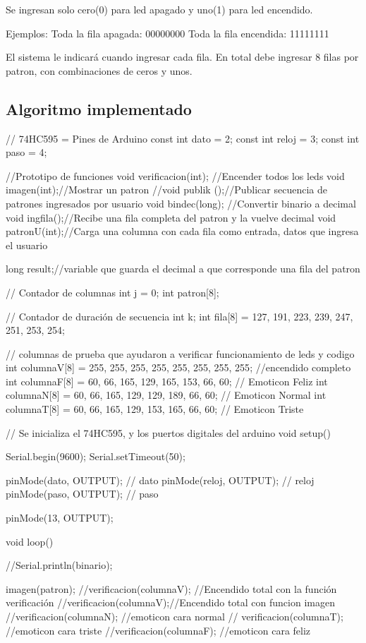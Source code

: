 \documentclass{article}
\begin{document}
Se ingresan solo cero(0) para led apagado y uno(1) para led encendido.

\vspace{0.5cm}
Ejemplos:
  \vspace{0.5cm}
Toda la fila apagada: 00000000
Toda la fila encendida: 11111111

El sistema le indicará cuando ingresar cada fila.
En total debe ingresar 8 filas por patron, con combinaciones de ceros y unos.


\subsection{Algoritmo implementado}
// 74HC595 = Pines de Arduino
const int dato = 2;
const int reloj = 3;
const int paso = 4;


//Prototipo de funciones
void verificacion(int); //Encender todos los leds
void imagen(int);//Mostrar un patron
//void publik ();//Publicar secuencia de patrones ingresados por usuario
void bindec(long); //Convertir binario a decimal
void ingfila();//Recibe una fila completa del patron y la vuelve decimal
void patronU(int);//Carga una columna con cada fila como entrada, datos que ingresa el usuario


long result;//variable que guarda el decimal a que corresponde una fila del patron

// Contador de columnas
int j = 0;
int patron[8];

// Contador de duración de secuencia
int k;
int fila[8] = {127, 191, 223, 239, 247, 251, 253, 254};

// columnas de prueba que ayudaron a verificar funcionamiento de leds y codigo
int columnaV[8] = {255, 255, 255, 255, 255, 255, 255, 255}; //encendido completo
int columnaF[8] = {60, 66, 165, 129, 165, 153, 66, 60}; // Emoticon Feliz
int columnaN[8] = {60, 66, 165, 129, 129, 189, 66, 60}; // Emoticon Normal
int columnaT[8] = {60, 66, 165, 129, 153, 165, 66, 60}; // Emoticon Triste

// Se inicializa el 74HC595, y los puertos digitales del arduino
void setup()
{
  Serial.begin(9600);
  Serial.setTimeout(50);
 
  pinMode(dato, OUTPUT); // dato
  pinMode(reloj, OUTPUT); // reloj
  pinMode(paso, OUTPUT); // paso
  
  pinMode(13, OUTPUT);
 }

void loop()
{    
   //Serial.println(binario);

    imagen(patron);
  //verificacion(columnaV); //Encendido total con la función verificación
  //verificacion(columnaV);//Encendido total con funcion imagen
   //verificacion(columnaN); //emoticon cara normal
  // verificacion(columnaT); //emoticon cara triste
  //verificacion(columnaF); //emoticon cara feliz
  }
  
\end{document}

